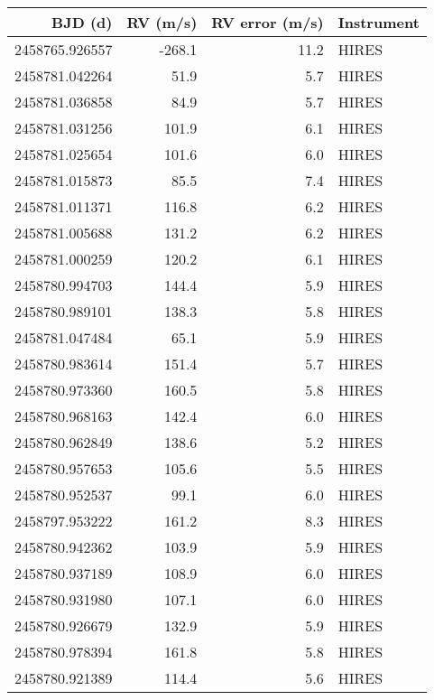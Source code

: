 \begin{tabular}{rrrl}
\toprule
       BJD (d) & RV (m/s) & RV error (m/s) & Instrument \\
\midrule
2458765.926557 &   -268.1 &           11.2 &      HIRES \\
2458781.042264 &     51.9 &            5.7 &      HIRES \\
2458781.036858 &     84.9 &            5.7 &      HIRES \\
2458781.031256 &    101.9 &            6.1 &      HIRES \\
2458781.025654 &    101.6 &            6.0 &      HIRES \\
2458781.015873 &     85.5 &            7.4 &      HIRES \\
2458781.011371 &    116.8 &            6.2 &      HIRES \\
2458781.005688 &    131.2 &            6.2 &      HIRES \\
2458781.000259 &    120.2 &            6.1 &      HIRES \\
2458780.994703 &    144.4 &            5.9 &      HIRES \\
2458780.989101 &    138.3 &            5.8 &      HIRES \\
2458781.047484 &     65.1 &            5.9 &      HIRES \\
2458780.983614 &    151.4 &            5.7 &      HIRES \\
2458780.973360 &    160.5 &            5.8 &      HIRES \\
2458780.968163 &    142.4 &            6.0 &      HIRES \\
2458780.962849 &    138.6 &            5.2 &      HIRES \\
2458780.957653 &    105.6 &            5.5 &      HIRES \\
2458780.952537 &     99.1 &            6.0 &      HIRES \\
2458797.953222 &    161.2 &            8.3 &      HIRES \\
2458780.942362 &    103.9 &            5.9 &      HIRES \\
2458780.937189 &    108.9 &            6.0 &      HIRES \\
2458780.931980 &    107.1 &            6.0 &      HIRES \\
2458780.926679 &    132.9 &            5.9 &      HIRES \\
2458780.978394 &    161.8 &            5.8 &      HIRES \\
2458780.921389 &    114.4 &            5.6 &      HIRES \\

\end{tabular}
